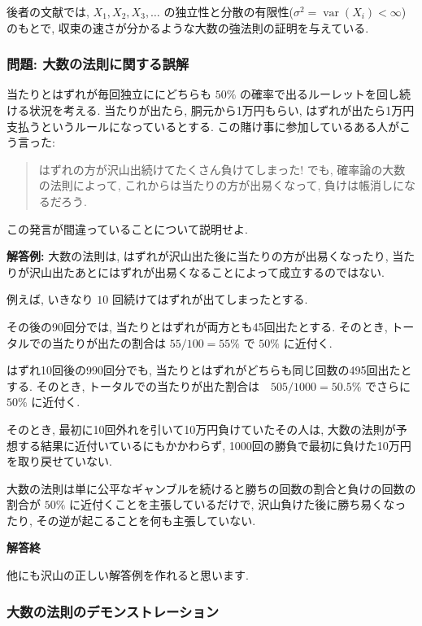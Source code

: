 \documentclass[10pt, a4paper,xelatex,ja=standard]{bxjsarticle}
\newcommand\op{\operatorname}
\begin{document}
後者の文献では, \(X_1,X_2,X_3,\ldots\)
の独立性と分散の有限性(\(\sigma^2 = \op{var}(X_i)<\infty\))のもとで,
収束の速さが分かるような大数の強法則の証明を与えている.

    \hypertarget{ux554fux984c-ux5927ux6570ux306eux6cd5ux5247ux306bux95a2ux3059ux308bux8aa4ux89e3}{%
\subsubsection{問題:
大数の法則に関する誤解}\label{ux554fux984c-ux5927ux6570ux306eux6cd5ux5247ux306bux95a2ux3059ux308bux8aa4ux89e3}}

当たりとはずれが毎回独立ににどちらも \(50\%\)
の確率で出るルーレットを回し続ける状況を考える. 当たりが出たら,
胴元から1万円もらい,
はずれが出たら1万円支払うというルールになっているとする.
この賭け事に参加しているある人がこう言った:

\begin{quote}
はずれの方が沢山出続けてたくさん負けてしまった! でも,
確率論の大数の法則によって, これからは当たりの方が出易くなって,
負けは帳消しになるだろう.
\end{quote}

この発言が間違っていることについて説明せよ.

\textbf{解答例:} 大数の法則は,
はずれが沢山出た後に当たりの方が出易くなったり,
当たりが沢山出たあとにはずれが出易くなることによって成立するのではない.

例えば, いきなり \(10\) 回続けてはずれが出てしまったとする.

その後の90回分では, 当たりとはずれが両方とも45回出たとする. そのとき,
トータルでの当たりが出たの割合は \(55/100=55\%\) で \(50\%\) に近付く.

はずれ10回後の990回分でも,
当たりとはずれがどちらも同じ回数の495回出たとする. そのとき,
トータルでの当たりが出た割合は　\(505/1000 = 50.5\%\) でさらに \(50\%\)
に近付く.

そのとき, 最初に10回外れを引いて10万円負けていたその人は,
大数の法則が予想する結果に近付いているにもかかわらず,
1000回の勝負で最初に負けた10万円を取り戻せていない.

大数の法則は単に公平なギャンブルを続けると勝ちの回数の割合と負けの回数の割合が
\(50\%\) に近付くことを主張しているだけで,
沢山負けた後に勝ち易くなったり, その逆が起こることを何も主張していない.

\textbf{解答終}

他にも沢山の正しい解答例を作れると思います.

    \hypertarget{ux5927ux6570ux306eux6cd5ux5247ux306eux30c7ux30e2ux30f3ux30b9ux30c8ux30ecux30fcux30b7ux30e7ux30f3}{%
\subsubsection{大数の法則のデモンストレーション}\label{ux5927ux6570ux306eux6cd5ux5247ux306eux30c7ux30e2ux30f3ux30b9ux30c8ux30ecux30fcux30b7ux30e7ux30f3}}
\end{document}
